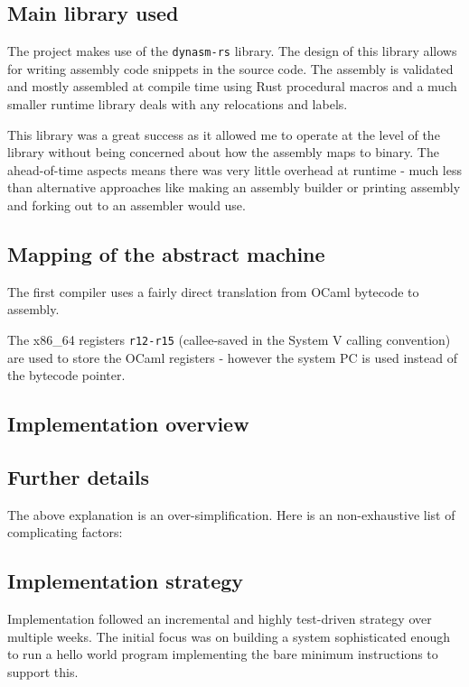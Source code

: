 \subsection{Main library used}

The project makes use of the \texttt{dynasm-rs} library. The design of this library allows for
writing assembly code snippets in the source code. The assembly is validated and mostly assembled
at compile time using Rust procedural macros and a much smaller runtime library deals with any
relocations and labels.

This library was a great success as it allowed me to operate at the level of the library without
being concerned about how the assembly maps to binary. The ahead-of-time aspects means there was
very little overhead at runtime - much less than alternative approaches like making an assembly
builder or printing assembly and forking out to an assembler would use.

\subsection{Mapping of the abstract machine}

The first compiler uses a fairly direct translation from OCaml bytecode to assembly.

The x86\_64 registers \texttt{r12-r15} (callee-saved in the System V calling convention) are used
to store the OCaml registers - however the system PC is used instead of the bytecode pointer.

\subsection{Implementation overview}

\subsection{Further details}

The above explanation is an over-simplification. Here is an non-exhaustive list of complicating
factors:

\subsection{Implementation strategy}

Implementation followed an incremental and highly test-driven strategy over multiple weeks. The
initial focus was on building a system sophisticated enough to run a hello world program
implementing the bare minimum instructions to support this.

